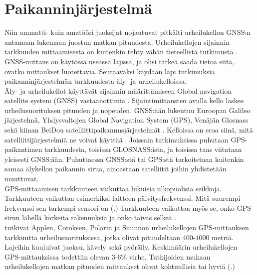 \documentclass[utf8,bachelor,finnish]{bachelor}
\begin{document}
         
  \section{Paikanninjärjestelmä}
  Niin ammatti- kuin amatööri juoksijat nojautuvat pitkälti urheilukellon GNSS:n antamaan lukemaan juostun matkan pituudesta.
   Urheilukellojen sijainnin tarkkuuden mittaamisesta on kuitenkin tehty vähän tieteellistä tutkimusta \parencite{gilgen-ammann_accuracy_2020}.
    GNSS-mittaus on käytössä useassa lajissa, ja olisi tärkeä saada tietoa siitä, ovatko mittaukset luotettavia. Seuraavaksi käydään läpi tutkimuksia
     paikanninjärjestelmän tarkkuudesta äly- ja urheilukelloissa.\\

  Äly- ja urheilukellot käyttävät sijainnin määrittämiseen Global navigation satellite system (GNSS) vastaanottimia \parencite{gilgen-ammann_accuracy_2020}. 
  Sijaintimittausten avulla kello laskee urheilusuorituksen pituuden ja nopeuden. GNSS:ään lukeutuu Euroopan Galileo järjestelmä, Yhdysvaltojen Global Navigation System (GPS),
   Venäjän Glosnass sekä kiinan BeiDou satelliittipaikannusjärjestelmät \parencite{hofmann2007gnss}.
    Kelloissa on eroa siinä, mitä satelliittijärjestelmiä ne voivat käyttää \parencite{ammann_accuracy_2016}.
     Joissain tutkimuksissa puhutaan GPS-paikantimen tarkkuudesta, toisissa GLOSNASS:ista, ja toisissa taas viitataan yleisesti GNSS:ään. Puhuttaessa GNSS:stä tai GPS:stä
      tarkoitetaan kuitenkin samaa älykellon paikannin sirua, ainoastaan satelliitit joihin yhdistetään muuttuvat.\\

  GPS-mittaamisen tarkkuuteen vaikuttaa lukuisia ulkopuolisia seikkoja. Tarkkuuteen vaikuttaa esimerkiksi laitteen päivitysfrekvenssi.
   Mitä suurempi frekvenssi sen tarkempi sensori on (\cite{cummins_global_2013}.) Tarkkuuteen vaikuttaa myös
    se, onko GPS-sirun lähellä korkeita rakennuksia ja onko taivas selkeä \parencite{baranski_enhancing_2012}. \\

  \textcite{gilgen-ammann_accuracy_2020} tutkivat Applen, Coroksen, Polarin ja Suunnon urheilukellojen GPS-mittauksen tarkkuutta urheilusuorituksissa, jotka olivat
    pituudeltaan 400-4000 metriä. Lajeihin kuuluivat juoksu, kävely sekä pyöräily. Keskimäärin urheilukellojen GPS-mittauksissa todettiin olevan 3-6\% virhe.
    Tutkijoiden mukaan urheilukellojen matkan pituuden mittaukset olivat kohtuullisia tai hyviä (\cite{gilgen-ammann_accuracy_2020}.)\\
\end{document}
